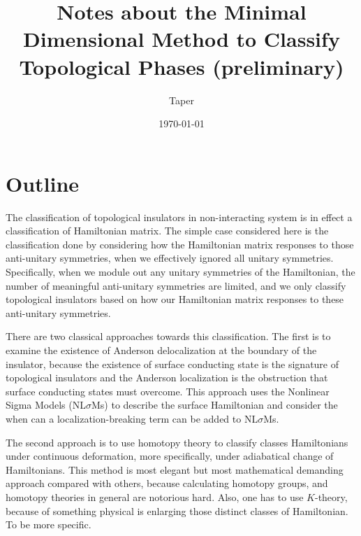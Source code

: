 \documentclass{article}
\title{Notes about the Minimal Dimensional Method to Classify
Topological Phases (preliminary)}
\date{\today}
\author{Taper}
\begin{document}
\maketitle
{}
\tableofcontents

\section{Outline}
\label{sec:Outline}
 
The classification of topological insulators in non-interacting system is in
effect a classification of Hamiltonian matrix. The simple case considered here
is the classification done by considering how the Hamiltonian matrix responses
to those anti-unitary symmetries, when we effectively ignored all unitary
symmetries. Specifically, when we module out any unitary symmetries of the
Hamiltonian, the number of meaningful anti-unitary symmetries are limited, and
we only classify topological insulators based on how our Hamiltonian matrix
responses to these anti-unitary symmetries.

There are two classical approaches towards this classification. The first is to
examine the existence of Anderson delocalization at the boundary of the
insulator, because the existence of surface conducting state is the signature of
topological insulators and the Anderson localization is the obstruction that
surface conducting states must overcome. This approach uses the Nonlinear Sigma
Models (NL$\sigma$Ms) to describe the surface Hamiltonian and consider the
when can a localization-breaking term can be added to NL$\sigma$Ms.

The second approach is to use homotopy theory to classify classes Hamiltonians under
continuous deformation, more specifically, under adiabatical change of
Hamiltonians. This method is most elegant but most mathematical demanding
approach compared with others, because calculating homotopy groups, and homotopy theories in
general are notorious hard. Also, one has to use $K$-theory, because of
something physical is enlarging those distinct classes of Hamiltonian. To be
more specific.
\end{document}
